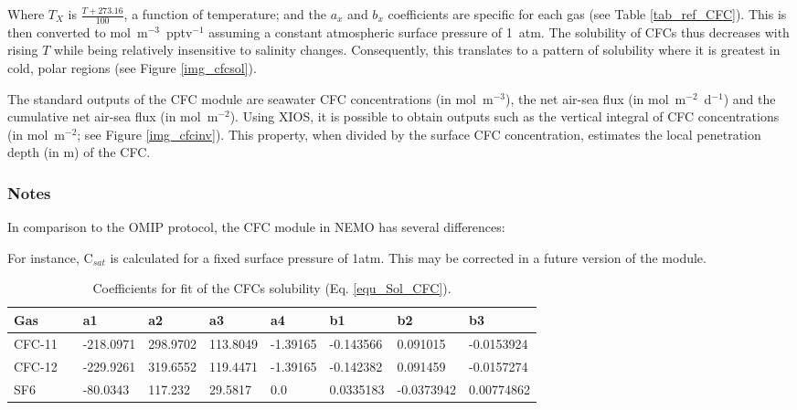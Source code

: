 \documentclass[../main/TOP_manual]{subfiles}
\begin{document}
Where $T_{X}$ is $\frac{T + 273.16}{100}$, a function of temperature;
and the $a_{x}$ and $b_{x}$ coefficients are specific for each gas (see Table \autoref{tab_ref_CFC}).
This is then converted to mol~m$^{-3}$~pptv$^{-1}$ assuming a constant atmospheric surface pressure of 1~atm.
The solubility of CFCs thus decreases with rising $T$ while being relatively insensitive to salinity changes.
Consequently, this translates to a pattern of solubility where it is greatest in cold, polar regions (see Figure \autoref{img_cfcsol}).


The standard outputs of the CFC module are seawater CFC concentrations (in mol~m$^{-3}$), the net air-sea flux (in mol~m$^{-2}$~d$^{-1}$) and the cumulative net air-sea flux (in mol~m$^{-2}$).
Using XIOS, it is possible to obtain outputs such as the vertical integral of CFC concentrations (in mol~m$^{-2}$; see Figure \autoref{img_cfcinv}).
This property, when divided by the surface CFC concentration, estimates the local penetration depth (in m) of the CFC.


\subsubsection*{Notes}

In comparison to the OMIP protocol, the CFC module in NEMO has several differences:


For instance, C$_{sat}$ is calculated for a fixed surface pressure of 1atm. This may be corrected in a future version of the module.\\


\begin{table}[!t]
\caption{Coefficients for fit of the CFCs solubility (Eq. \autoref{equ_Sol_CFC}).}
\vskip4mm
\centering
\begin{tabular}{l l l l l l l l l}
\hline
Gas   & & a1 & a2 & a3 & a4 & b1 & b2 & b3 \\
\hline
CFC-11 & & -218.0971 & 298.9702 & 113.8049 & -1.39165 & -0.143566  & 0.091015   & -0.0153924 \\
CFC-12 & & -229.9261 & 319.6552 & 119.4471 & -1.39165 & -0.142382  & 0.091459   & -0.0157274 \\
SF6    & & -80.0343  & 117.232  & 29.5817  & 0.0      & 0.0335183  & -0.0373942 & 0.00774862 \\
\hline
\end{tabular}
\label{tab_ref_CFC}
\end{table}
\end{document}
